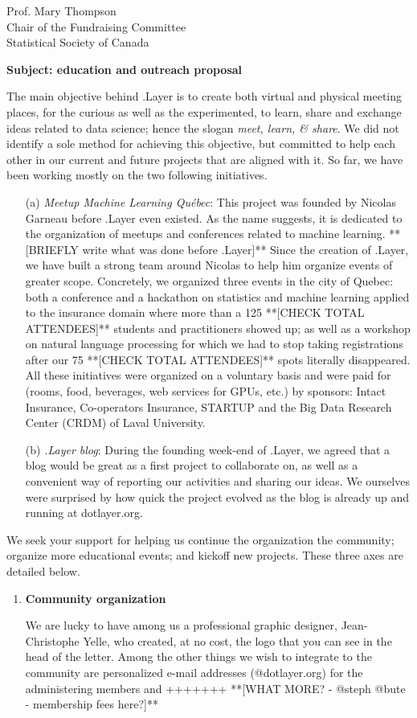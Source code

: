 \documentclass[11pt, a4paper]{letter} %
\begin{document}
\begin{letter}{
	Prof. Mary Thompson\\
	Chair of the Fundraising Committee\\
	Statistical Society of Canada
	
	\bigskip
	\textbf{Subject: education and outreach proposal}%
}
The main objective behind .Layer is to create both virtual and physical meeting places, for the curious as well as the experimented, to learn, share and exchange ideas related to data science; hence the slogan \emph{meet, learn, \& share}. We did not identify a sole method for achieving this objective, but committed to help each other in our current and future projects that are aligned with it. So far, we have been working mostly on the two following initiatives.
\begin{enumerate}
	\item[(a)] \emph{Meetup Machine Learning Québec}: This project was founded by Nicolas Garneau before .Layer even existed. As the name suggests, it is dedicated to the organization of meetups and conferences related to machine learning. **[BRIEFLY write what was done before .Layer]** Since the creation of .Layer, we have built a strong team around Nicolas to help him organize events of greater scope. Concretely, we organized three events in the city of Quebec: both a conference and a hackathon on statistics and machine learning applied to the insurance domain where more than a 125 **[CHECK TOTAL ATTENDEES]** students and practitioners showed up; as well as a workshop on natural language processing for which we had to stop taking registrations after our 75 **[CHECK TOTAL ATTENDEES]** spots literally disappeared. All these initiatives were organized on a voluntary basis and were paid for (rooms, food, beverages, web services for GPUs, etc.) by sponsors: Intact Insurance, Co-operators Insurance, STARTUP and the Big Data Research Center (CRDM) of Laval University.
	\item[(b)] \emph{.Layer blog}: During the founding week-end of .Layer, we agreed that a blog would be great as a first project to collaborate on, as well as a convenient way of reporting our activities and sharing our ideas. We ourselves were surprised by how quick the project evolved as the blog is already up and running at dotlayer.org.
\end{enumerate}

We seek your support for helping us continue the organization the community; organize more educational events; and kickoff new projects. These three axes are detailed below.

\begin{enumerate}
	\item \textbf{Community organization}
	
	\quad We are lucky to have among us a professional graphic designer, Jean-Christophe Yelle, who created, at no cost, the logo that you can see in the head of the letter. Among the other things we wish to integrate to the community are personalized e-mail addresses (@dotlayer.org) for the administering members and +++++++ **[WHAT MORE? - @steph @bute - membership fees here?]**
	

\end{enumerate}
\end{letter}
\end{document}
